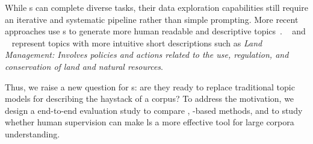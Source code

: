 %
While \mm{}s can complete diverse tasks, their data exploration
capabilities still require an iterative and systematic pipeline rather than simple
prompting.
%
More recent approaches use \mm{}s to generate more human readable and
descriptive topics~\cite{openai2024gpt4,touvron2023llama}.
%
%
%
%
\topicgpt{}~\cite{pham2024topicgpt} and \lloom{}~\cite{lam2024concept} represent topics with more intuitive short descriptions
such as \textit{Land Management: Involves policies and actions related to the use, regulation, and conservation of land and natural resources}. 

Thus, we raise a new question for \mm{}s: are they ready to replace traditional topic models for describing the haystack of a corpus?
%
%
To address the motivation, we design a end-to-end evaluation study to
compare , \mm{}-based methods, and \bass{} to study whether
human supervision can make \mm{}ls a more
effective tool for large corpora understanding.
%
%

